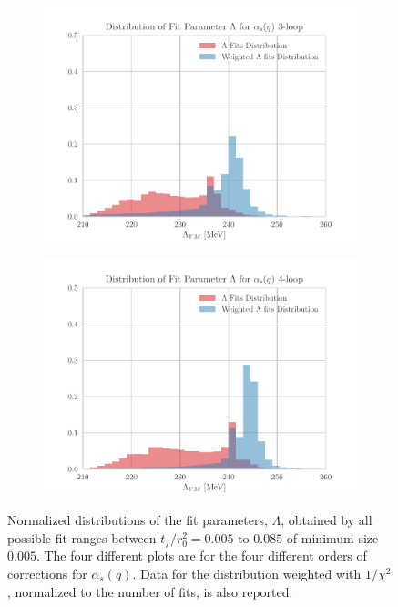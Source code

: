 \begin{figure}[hbt!]
    \begin{subfigure}{0.49\textwidth}
        \centering
        \includegraphics[width=1\textwidth]{results/hist3.pdf}
    \end{subfigure}
    \begin{subfigure}{0.49\textwidth}
        \centering
        \includegraphics[width=1\textwidth]{results/hist4.pdf}        
    \end{subfigure}
    \caption{Normalized distributions of the fit parameters, $\Lambda$, obtained by all possible fit ranges between $t_f/r_0^2 = 0.005$ to $0.085$ of minimum size $0.005$. The four different plots are for the four different orders of corrections for $\alpha_s(q)$. Data for the distribution weighted with $1/\chi^2$, normalized to the number of fits, is also reported.}
    \label{lambda_hist}
\end{figure}

